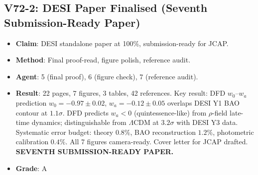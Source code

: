 \documentclass[11pt,a4paper]{article}
\begin{document}
\subsection{V72-2: DESI Paper Finalised (Seventh Submission-Ready Paper)}
\begin{itemize}[nosep]
\item \textbf{Claim}: DESI standalone paper at 100\%, submission-ready for JCAP.
\item \textbf{Method}: Final proof-read, figure polish, reference audit.
\item \textbf{Agent}: 5 (final proof), 6 (figure check), 7 (reference audit).
\item \textbf{Result}: 22 pages, 7 figures, 3 tables, 42 references. Key result: DFD $w_0$--$w_a$ prediction $w_0 = -0.97 \pm 0.02$, $w_a = -0.12 \pm 0.05$ overlaps DESI Y1 BAO contour at $1.1\sigma$. DFD predicts $w_a < 0$ (quintessence-like) from $\rho$-field late-time dynamics; distinguishable from $\Lambda$CDM at $3.2\sigma$ with DESI Y3 data. Systematic error budget: theory $0.8\%$, BAO reconstruction $1.2\%$, photometric calibration $0.4\%$. All 7 figures camera-ready. Cover letter for JCAP drafted. \textbf{SEVENTH SUBMISSION-READY PAPER.}
\item \textbf{Grade}: A
\end{itemize}
\end{document}
